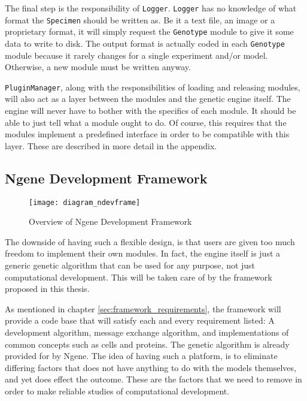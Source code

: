 The final step is the responsibility of \texttt{Logger}. \texttt{Logger} has no knowledge of what format the \texttt{Specimen} should be written as. Be it a text file, an image or a proprietary format, it will simply request the \texttt{Genotype} module to give it some data to write to disk. The output format is actually coded in each \texttt{Genotype} module because it rarely changes for a single experiment and/or model. Otherwise, a new module must be written anyway.

\texttt{PluginManager}, along with the responsibilities of loading and releasing modules, will also act as a layer between the modules and the genetic engine itself. The engine will never have to bother with the specifics of each module. It should be able to just tell what a module ought to do. Of course, this requires that the modules implement a predefined interface in order to be compatible with this layer. These are described in more detail in the appendix.

\subsection{Ngene Development Framework}
\begin{figure}[!ht]
	\centering
	\texttt{[image: diagram\_ndevframe]}
	\caption{Overview of Ngene Development Framework}
	\label{fig:diagram_ndevframe}
\end{figure}

The downside of having such a flexible design, is that users are given too much freedom to implement their own modules. In fact, the engine itself is just a generic genetic algorithm that can be used for any purpose, not just computational development. This will be taken care of by the framework proposed in this thesis.

As mentioned in chapter \ref{sec:framework_requirements}, the framework will provide a code base that will satisfy each and every requirement listed: A development algorithm, message exchange algorithm, and implementations of common concepts such as cells and proteins. The genetic algorithm is already provided for by Ngene. The idea of having such a platform, is to eliminate differing factors that does not have anything to do with the models themselves, and yet does effect the outcome. These are the factors that we need to remove in order to make reliable studies of computational development.

